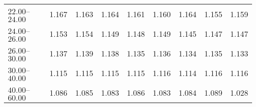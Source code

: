 \begin{table}[htp]
\begin{tiny}
\begin{center}
\begin{tabular}{|l|c|c|c|c|c|c|c|c|}
$22.00$--$24.00$ & 1.167 & 1.163 & 1.164 & 1.161 & 1.160 & 1.164 & 1.155 & 1.159  \\
$24.00$--$26.00$ & 1.153 & 1.154 & 1.149 & 1.148 & 1.149 & 1.145 & 1.147 & 1.147  \\
$26.00$--$30.00$ & 1.137 & 1.139 & 1.138 & 1.135 & 1.136 & 1.134 & 1.135 & 1.133  \\
$30.00$--$40.00$ & 1.115 & 1.115 & 1.115 & 1.115 & 1.116 & 1.114 & 1.116 & 1.116  \\
$40.00$--$60.00$ & 1.086 & 1.085 & 1.083 & 1.086 & 1.083 & 1.084 & 1.089 & 1.028  \\
\hline
\end{tabular} 
             \end{center} 
             \end{tiny} 
             \label{tab:sa_trp0_psi2s} 
             \end{table}


